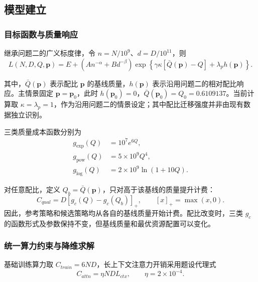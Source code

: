 \documentclass[bwprint]{gmcmthesis}
\numberwithin{equation}{section}
\numberwithin{figure}{section}
\numberwithin{table}{section}
\begin{document}
    \subsection{模型建立}

        \subsubsection{目标函数与质量响应}

        继承问题二的广义标度律，令 $n=N/10^9$、$d=D/10^{11}$，则
        \begin{equation}
        L(N,D,Q,\bm p)
        =E+\left(An^{-\alpha}+Bd^{-\beta}\right)
        \exp\left\{\gamma\kappa[\bar Q(\bm p)-Q]+\lambda_p h(\bm p)\right\}.
        \label{eq:p3_loss}
        \end{equation}

        其中，$\bar Q(\bm p)$ 表示配比 $\bm p$ 的基线质量，$h(\bm p)$ 表示沿用问题二的相对配比响应。主情景固定 $\bm p=\bm p_0$，此时 $h(\bm p_0)=0$，$\bar Q(\bm p_0)=Q_0=0.6109137$。当前计算取 $\kappa=\lambda_p=1$，作为沿用问题二的情景设定；其中配比迁移强度并非由现有数据独立识别。

        三类质量成本函数分别为
        \begin{equation}
        \begin{aligned}
        g_{\exp}(Q)&=10^7e^{6Q},\\
        g_{\mathrm{pow}}(Q)&=5\times10^9Q^4,\\
        g_{\log}(Q)&=2\times10^9\ln(1+10Q).
        \end{aligned}
        \label{eq:p3_quality_cost}
        \end{equation}

        对任意配比，定义 $Q_b=\bar Q(\bm p)$，只对高于该基线的质量提升计费：
        \begin{equation}
        C_{qual}=D[g_c(Q)-g_c(Q_b)]_+,
        \qquad [x]_+=\max(x,0).
        \label{eq:p3_quality_compute}
        \end{equation}
        因此，参考策略和候选策略均从各自的基线质量开始计费。配比改变时，三类 $g_c$ 的函数形式及参数保持不变，但基线质量和最优资源配置可以变化。

        \subsubsection{统一算力约束与降维求解}

        基础训练算力取 $C_{train}=6ND$，长上下文注意力开销采用题设代理式
        \begin{equation}
        C_{attn}=\eta NDL_{ctx},
        \qquad \eta=2\times10^{-4}.
        \label{eq:p3_attention}
        \end{equation}
\end{document}

